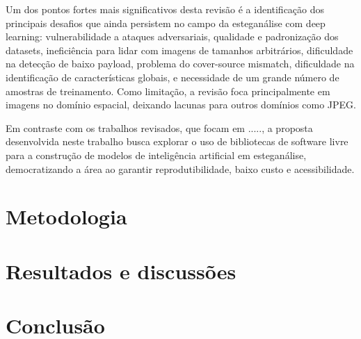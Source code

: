 \documentclass[12pt]{article}
\begin{document}
Um dos pontos fortes mais significativos desta revisão é a identificação dos
principais desafios que ainda persistem no campo da esteganálise com deep
learning: vulnerabilidade a ataques adversariais, qualidade e padronização dos
datasets, ineficiência para lidar com imagens de tamanhos arbitrários,
dificuldade na detecção de baixo payload, problema do cover-source mismatch,
dificuldade na identificação de características globais, e necessidade de um
grande número de amostras de treinamento. Como limitação, a revisão foca
principalmente em imagens no domínio espacial, deixando lacunas para outros
domínios como JPEG.

Em contraste com os trabalhos revisados, que focam em .....,  a proposta desenvolvida neste trabalho
busca explorar o uso de bibliotecas de software livre para a construção de
modelos de inteligência artificial em esteganálise, democratizando a área ao
garantir reprodutibilidade, baixo custo e acessibilidade.

\section{Metodologia}

\section{Resultados e discussões}

\section{Conclusão}\label{sec:figs}






\end{document}
